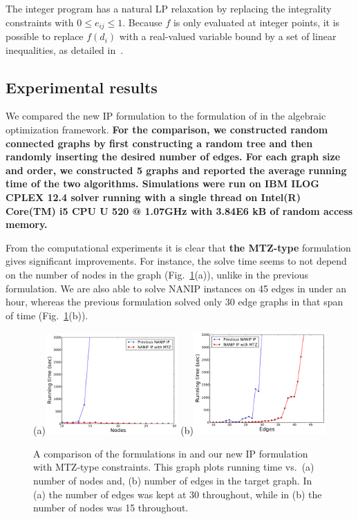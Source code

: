 \documentclass[english]{llncs}
\newcommand{\chg}[1]{\textbf{\color{red} #1}}
\begin{document}
The integer program has a natural LP relaxation by replacing the integrality
constraints with $0 \leq e_{ij} \leq 1$. 
Because $f$ is only evaluated at integer points, it is possible to replace $f(d_i)$
with a real-valued variable bound by a set of linear inequalities, as detailed in~\cite{Gutfraind14}.

\subsection{Experimental results}
We compared the new IP formulation to the formulation of
\cite{Gutfraind14} in the algebraic optimization framework.
\chg{For the comparison, we constructed random connected graphs by first constructing a random tree 
and then randomly inserting the desired number of edges.
For each graph size and order, we constructed 5 graphs and reported the average running time of the two algorithms.
Simulations were run on IBM ILOG CPLEX 12.4 solver running with a single thread on Intel(R) Core(TM)
i5 CPU U 520  @ 1.07GHz with 3.84E6 kB of random access memory. }

From the computational experiments it is clear that \chg{the MTZ-type} formulation gives
significant improvements.  For instance, the solve time seems to not depend on
the number of nodes in the graph (Fig.~\ref{fig:iptime}(a)), unlike in the
previous formulation.  We are also able to solve NANIP instances on 45 edges in
under an hour, whereas the previous formulation solved only 30 edge graphs in
that span of time (Fig.~\ref{fig:iptime}(b)).

\begin{figure}[th]
\begin{centering}
(a)\includegraphics[width=0.45\textwidth]{perf_ip_nodes} 
(b)\includegraphics[width=0.45\textwidth]{perf_ip_edges} 
\par
\end{centering}
\caption{A comparison of the formulations in
\cite{Gutfraind14} and our new IP formulation with MTZ-type
constraints.  This graph plots running time vs.\ (a) number of nodes and, (b)
number of edges in the target graph.
In (a) the number of edges was kept at 30 throughout, while in (b) the number
of nodes was 15 throughout.\label{fig:iptime}} 
\end{figure}
\end{document}
